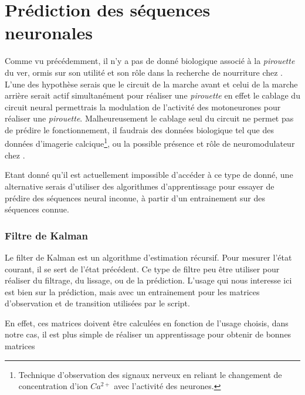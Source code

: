 \chapter{Prédiction des séquences neuronales} %
\label{cha:Prédire des séquences neuronales}

Comme vu précédemment, il n'y a pas de donné biologique associé à la
\textit{pirouette} du ver, ormis sur son utilité et son rôle dans la recherche
de nourriture chez \celeg{}\cite{Gray2005}. L'une des hypothèse serais que le
circuit de la marche avant et celui de la marche arrière serait actif
simultanément pour réaliser une \textit{pirouette} en effet le cablage du
circuit neural permettrais la modulation de l'activité des motoneurones pour
réaliser une \textit{pirouette}. Malheureusement le cablage seul du circuit ne
permet pas de prédire le fonctionnement, il faudrais des données biologique tel
que des données d'imagerie calcique\footnote{Technique d'observation des
signaux nerveux en reliant le changement de concentration d'ion $Ca^{2+}$ avec
l'activité des neurones.}, ou la possible présence et rôle de neuromodulateur
chez \celeg{}.

Etant donné qu'il est actuellement impossible d'accéder à ce type de donné, une
alternative serais d'utiliser des algorithmes d'apprentissage pour essayer de
prédire des séquences neural inconue, à partir d'un entrainement sur des séquences
connue.

\subsection{Filtre de Kalman} %
\label{sub:Filtre de Kalman}

Le filter de Kalman est un algorithme d'estimation récursif. Pour mesurer
l'état courant, il se sert de l'état précédent. Ce type de filtre peu être
utiliser pour réaliser du filtrage, du lissage, ou de la prédiction. L'usage
qui nous interesse ici est bien sur la prédiction, mais avec un entrainement
pour les matrices d'observation et de transition utilisées par le script.

En effet, ces matrices doivent être calculées en fonction de l'usage choisis,
dans notre cas, il est plus simple de réaliser un apprentissage pour obtenir de
bonnes matrices


